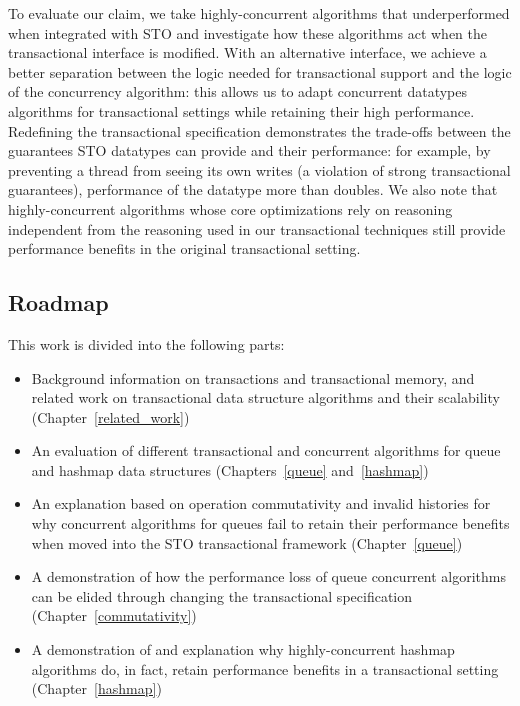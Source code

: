 To evaluate our claim, we take highly-concurrent algorithms that underperformed when integrated with STO and investigate how these algorithms act when the transactional interface is modified. 
With an alternative interface, we achieve a better separation between the logic needed for transactional support and the logic of the concurrency algorithm: this allows us to adapt concurrent datatypes algorithms for transactional settings while retaining their high performance.
Redefining the transactional specification demonstrates the trade-offs between the guarantees STO datatypes can provide and their performance: for example, by preventing a thread from seeing its own writes (a violation of strong transactional guarantees), performance of the datatype more than doubles.
We also note that highly-concurrent algorithms whose core optimizations rely on reasoning independent from the reasoning used in our transactional techniques still provide performance benefits in the original transactional setting.

\subsection{Roadmap}
This work is divided into the following parts: 
\begin{itemize}
    \item Background information on transactions and transactional memory, and related work on transactional data structure algorithms and their scalability (Chapter~\ref{related_work})
    \item An evaluation of different transactional and concurrent algorithms for queue and hashmap data structures (Chapters~\ref{queue} and~\ref{hashmap})
    \item An explanation based on operation commutativity and invalid histories for why concurrent algorithms for queues fail to retain their performance benefits when moved into the STO transactional framework (Chapter~\ref{queue})
    \item A demonstration of how the performance loss of queue concurrent algorithms can be elided through changing the transactional specification (Chapter~\ref{commutativity})
    \item A demonstration of and explanation why highly-concurrent hashmap algorithms do, in fact, retain performance benefits in a transactional setting (Chapter~\ref{hashmap})
\end{itemize}
